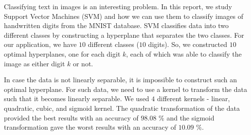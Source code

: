 
\noindent
{Classifying text in images is an interesting problem. In this report, we study Support Vector Machines (SVM)\cite{statistical-learning} and how we can use them to classify images of handwritten digits from the MNIST database\cite{mnist}. SVM classifies data into two different classes by constructing a hyperplane that separates the two classes. For our application, we have $10$ different classes ($10$ digits). So, we constructed $10$ optimal hyperplanes, one for each digit $k$, each of which was able to classify the image as either digit $k$ or not.}

\noindent
{In case the data is not linearly separable, it is impossible to construct such an optimal hyperplane. For such data, we need to use a kernel to transform the data such that it becomes linearly separable. We used $4$ different kernels - linear, quadratic, cubic, and sigmoid kernel. The quadratic transformation of the data provided the best results with an accuracy of $98.08$ \% and the sigmoid transformation gave the worst results with an accuracy of $10.09$ \%.}